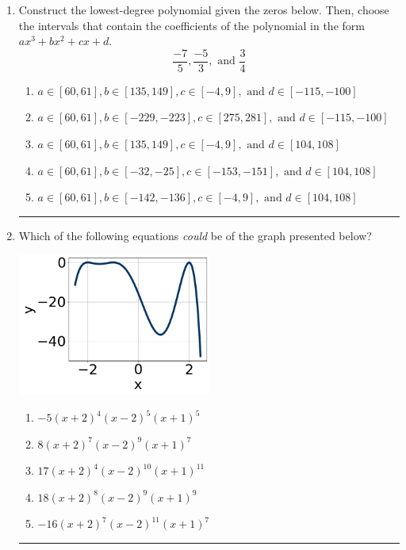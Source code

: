 \documentclass[14pt]{extbook}
\newcommand{\litem}[1]{\item#1\hspace*{-1cm}\rule{\textwidth}{0.4pt}}
\begin{document}
\begin{enumerate}
{\begin{enumerate}[label=\Alph*.]
\end{enumerate} }
\litem{
Construct the lowest-degree polynomial given the zeros below. Then, choose the intervals that contain the coefficients of the polynomial in the form $ax^3+bx^2+cx+d$.\[ \frac{-7}{5}, \frac{-5}{3}, \text{ and } \frac{3}{4} \]\begin{enumerate}[label=\Alph*.]
\item \( a \in [60, 61], b \in [135, 149], c \in [-4, 9], \text{ and } d \in [-115, -100] \)
\item \( a \in [60, 61], b \in [-229, -223], c \in [275, 281], \text{ and } d \in [-115, -100] \)
\item \( a \in [60, 61], b \in [135, 149], c \in [-4, 9], \text{ and } d \in [104, 108] \)
\item \( a \in [60, 61], b \in [-32, -25], c \in [-153, -151], \text{ and } d \in [104, 108] \)
\item \( a \in [60, 61], b \in [-142, -136], c \in [-4, 9], \text{ and } d \in [104, 108] \)

\end{enumerate} }
\litem{
Which of the following equations \textit{could} be of the graph presented below?
\begin{center}
    \includegraphics[width=0.5\textwidth]{../Figures/polyGraphToFunctionB.png}
\end{center}
\begin{enumerate}[label=\Alph*.]
\item \( -5(x + 2)^{4} (x - 2)^{5} (x + 1)^{5} \)
\item \( 8(x + 2)^{7} (x - 2)^{9} (x + 1)^{7} \)
\item \( 17(x + 2)^{4} (x - 2)^{10} (x + 1)^{11} \)
\item \( 18(x + 2)^{8} (x - 2)^{9} (x + 1)^{9} \)
\item \( -16(x + 2)^{7} (x - 2)^{11} (x + 1)^{7} \)

\end{enumerate} }
\end{enumerate}
\end{document}
